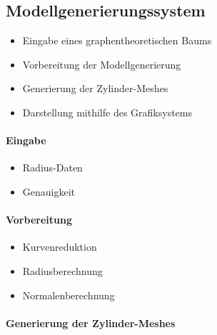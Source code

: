 \subsection{Modellgenerierungssystem \\}
\begin{itemize}
	\item Eingabe eines graphentheoretischen Baums\\
	
	\item Vorbereitung der Modellgenerierung \\
	
	\item Generierung der Zylinder-Meshes\\
	
	\item Darstellung mithilfe des Grafiksystems
\end{itemize}





\newpage
{}
\paragraph{Eingabe\\ }
\begin{itemize}
	\item Radius-Daten
	\item Genauigkeit \\
\end{itemize}
\paragraph{Vorbereitung\\ }
\begin{itemize}
	\item Kurvenreduktion
	\item Radiusberechnung
	\item Normalenberechnung
\end{itemize}





\newpage
{}
\paragraph{Generierung der Zylinder-Meshes\\}


